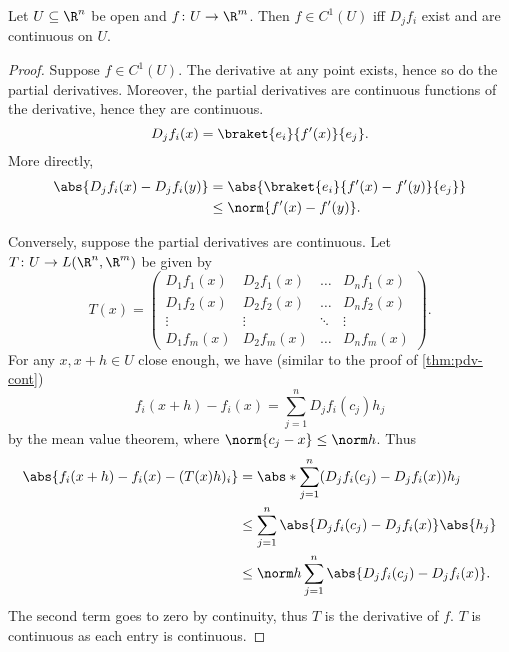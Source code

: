 \begin{proposition}
    Let $U \subseteq \R^n$ be open and $f\colon U \to \R^m$.
    Then $f \in C^1(U)$ iff $D_j f_i$ exist and are continuous on $U$.
\end{proposition}
\begin{proof}
    Suppose $f \in C^1(U)$.
    The derivative at any point exists, hence so do the partial derivatives.
    Moreover, the partial derivatives are continuous functions of the
    derivative, hence they are continuous. \[
        D_j f_i(x) = \braket{e_i}{f'(x)}{e_j}.
    \] More directly, \begin{align*}
        \abs{D_j f_i(x) - D_j f_i(y)}
        &= \abs{\braket{e_i}{f'(x) - f'(y)}{e_j}} \\
        &\le \norm{f'(x) - f'(y)}.
    \end{align*}

    Conversely, suppose the partial derivatives are continuous.
    Let $T\colon U \to L(\R^n, \R^m)$ be given by \[
        T(x) = \begin{pmatrix}
            D_1f_1(x) & D_2f_1(x) & \dots & D_nf_1(x) \\
            D_1f_2(x) & D_2f_2(x) & \dots & D_nf_2(x) \\
            \vdots & \vdots & \ddots & \vdots \\
            D_1f_m(x) & D_2f_m(x) & \dots & D_nf_m(x)
        \end{pmatrix}.
    \]
    For any $x, x+h \in U$ close enough, we have (similar to the proof of
    \cref{thm:pdv-cont}) \[
        f_i(x + h) - f_i(x) = \sum_{j=1}^n D_j f_i(c_j) h_j
    \] by the mean value theorem, where $\norm{c_j - x} \le \norm h$.
    Thus \begin{align*}
        \abs{f_i(x+h) - f_i(x) - (T(x)h)_i}
        &= \abs*{\sum_{j=1}^n (D_j f_i(c_j) - D_j f_i(x)) h_j} \\
        &\le \sum_{j=1}^n \abs{D_j f_i(c_j) - D_j f_i(x)} \abs{h_j} \\
        &\le \norm h \sum_{j=1}^n \abs{D_j f_i(c_j) - D_j f_i(x)}.
    \end{align*} The second term goes to zero by continuity,
    thus $T$ is the derivative of $f$.
    $T$ is continuous as each entry is continuous.
\end{proof}
